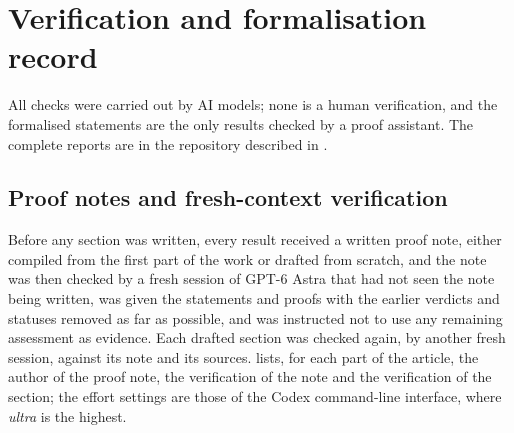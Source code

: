 \section{Verification and formalisation record}
\label{app:verification}

All checks
were carried out by AI models; none is a human verification, and the
formalised statements are the only results checked by a proof assistant. The
complete reports are in the repository described in .

\subsection*{Proof notes and fresh-context verification}

Before any section was written, every result received a written proof note,
either compiled from the first part of the work or drafted from scratch, and
the note was then checked by a fresh session of GPT-6 Astra that had not seen
the note being written, was given the statements and proofs with the earlier
verdicts and statuses removed as far as possible, and was instructed not to use
any remaining assessment as evidence. Each drafted section was checked
again, by another fresh session, against its note and its sources.
 lists, for each part of the article, the author of the
proof note, the verification of the note and the verification of the section;
the effort settings are those of the Codex command-line interface, where
\emph{ultra} is the highest.


